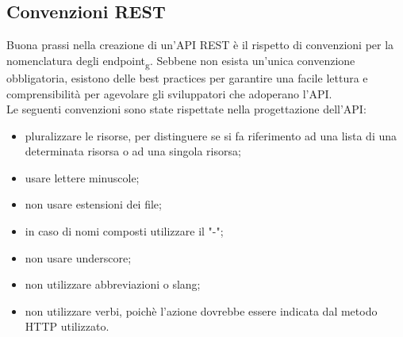 \subsection{Convenzioni REST}
Buona prassi nella creazione di un'API REST è il rispetto di convenzioni per la nomenclatura degli endpoint\textsubscript{g}. Sebbene non esista un'unica convenzione obbligatoria, esistono delle best practices per garantire una facile lettura e comprensibilità per agevolare gli sviluppatori che adoperano l'API.\\
Le seguenti convenzioni sono state rispettate nella progettazione dell'API:
\begin{itemize}
\item  pluralizzare le risorse, per distinguere se si fa riferimento ad una lista di una determinata risorsa o ad una singola risorsa;
\item usare lettere minuscole;
\item non usare estensioni dei file;
\item in caso di nomi composti utilizzare il "-";
\item non usare underscore;
\item non utilizzare abbreviazioni o slang;
\item non utilizzare verbi, poichè l'azione dovrebbe essere indicata dal metodo HTTP utilizzato.
\end{itemize}